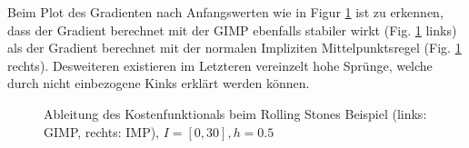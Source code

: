 Beim Plot des Gradienten nach Anfangswerten wie in Figur \ref{fig:rollingGrad} ist zu erkennen, dass der Gradient berechnet mit der GIMP ebenfalls stabiler wirkt (Fig. \ref{fig:rollingGrad} links) als der Gradient berechnet mit der normalen Impliziten Mittelpunktsregel (Fig. \ref{fig:rollingGrad} rechts). Desweiteren existieren im Letzteren vereinzelt hohe Sprünge, welche durch nicht einbezogene Kinks erklärt werden können. 
\begin{figure}[H]
\footnotesize 
\centering
\begin{minipage}[b]{0.49\linewidth}

\end{minipage}
\begin{minipage}[b]{0.49\linewidth}

\end{minipage}
\begin{minipage}[b]{0.49\linewidth}

\end{minipage}
\begin{minipage}[b]{0.49\linewidth}

\end{minipage}
\caption{Ableitung des Kostenfunktionals beim Rolling Stones Beispiel (links: GIMP, rechts: IMP), $I = [0,30],h=0.5$}
\label{fig:rollingGrad}
\end{figure}


